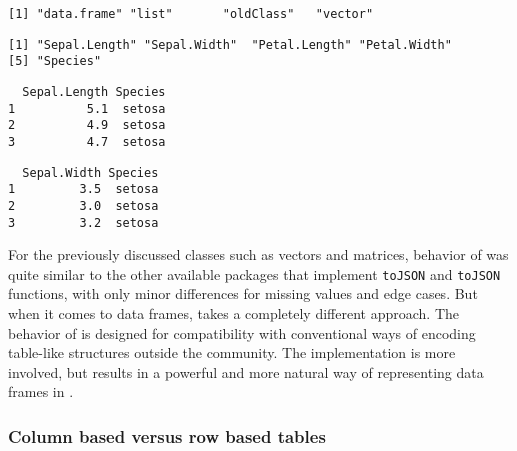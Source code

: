 \begin{knitrout}\mycodesize
{}\color{fgcolor}\begin{kframe}
\begin{alltt}
\end{alltt}
\begin{verbatim}
[1] "data.frame" "list"       "oldClass"   "vector"    
\end{verbatim}
\begin{alltt}
\end{alltt}
\begin{verbatim}
[1] "Sepal.Length" "Sepal.Width"  "Petal.Length" "Petal.Width" 
[5] "Species"     
\end{verbatim}
\begin{alltt}
\hlstd{(iris[}\hlopt{:}\hlstd{,} \hlstd{(}\hlstd{,} \hlstd{)])}
\end{alltt}
\begin{verbatim}
  Sepal.Length Species
1          5.1  setosa
2          4.9  setosa
3          4.7  setosa
\end{verbatim}
\begin{alltt}
\hlstd{(iris[}\hlopt{:}\hlstd{,} \hlstd{(}\hlstd{,} \hlstd{)])}
\end{alltt}
\begin{verbatim}
  Sepal.Width Species
1         3.5  setosa
2         3.0  setosa
3         3.2  setosa
\end{verbatim}
\end{kframe}
\end{knitrout}


 For the previously discussed classes such as vectors and matrices, behavior of \jsonlite was quite similar to the other available packages that implement \texttt{toJSON} and \texttt{toJSON} functions, with only minor differences for missing values and edge cases. But when it comes to data frames, \jsonlite takes a completely different approach. The behavior of \jsonlite is designed for compatibility with conventional ways of encoding table-like structures outside the \R community. The implementation is more involved, but results in a powerful and more natural way of representing data frames in \JSON.

\subsubsection{Column based versus row based tables}

